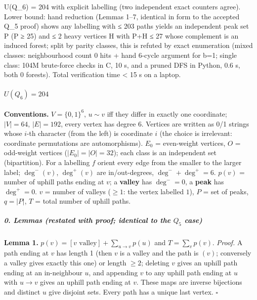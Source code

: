 
U(Q\_6) = 204 with explicit labelling (two independent exact counters
agree). Lower bound: hand reduction (Lemmas 1--7, identical in form to
the accepted Q\_5 proof) shows any labelling with ≤ 203 paths yields an
independent peak set P (\textbar P\textbar{} ≥ 25) and ≤ 2 heavy
vertices H with \textbar P\textbar+\textbar H\textbar{} ≤ 27 whose
complement is an induced forest; split by parity classes, this is
refuted by exact enumeration (mixed classes: neighbourhood count 0 hits
+ hand 6-cycle argument for b=1; single class: 104M brute-force checks
in C, 10 s, and a pruned DFS in Python, 0.6 s, both 0 forests). Total
verification time \textless{} 15 s on a laptop.


\paragraph{\texorpdfstring{\(U(Q_6)=204\)}{U(Q\_6)=204}}\label{uq_6204}

\textbf{Conventions.} \(V=\{0,1\}^6\), \(u\sim v\) iff they differ in
exactly one coordinate; \(|V|=64\), \(|E|=192\), every vertex has degree
\(6\). Vertices are written as 0/1 strings whose \(i\)-th character
(from the left) is coordinate \(i\) (the choice is irrelevant:
coordinate permutations are automorphisms). \(E_0\) = even-weight
vertices, \(O\) = odd-weight vertices (\(|E_0|=|O|=32\)); each class is
an independent set (bipartition). For a labelling \(f\) orient every
edge from the smaller to the larger label; \(\deg^-(v)\), \(\deg^+(v)\)
are in/out-degrees, \(\deg^-+\deg^+=6\). \(p(v)\) = number of uphill
paths ending at \(v\); a \textbf{valley} has \(\deg^-=0\), a
\textbf{peak} has \(\deg^+=0\). \(v\) = number of valleys (\(\ge1\): the
vertex labelled \(1\)), \(P\) = set of peaks, \(q=|P|\), \(T\) = total
number of uphill paths.

\subparagraph{\texorpdfstring{0. Lemmas (restated with proof; identical
to the \(Q_5\)
case)}{0. Lemmas (restated with proof; identical to the Q\_5 case)}}\label{lemmas-restated-with-proof-identical-to-the-q_5-case}

\textbf{Lemma 1.} \(p(v)=[v\text{ valley}]+\sum_{u\to v}p(u)\) and
\(T=\sum_v p(v)\). \emph{Proof.} A path ending at \(v\) has length 1
(then \(v\) is a valley and the path is \((v)\); conversely a valley
gives exactly this one) or length \(\ge2\); deleting \(v\) gives an
uphill path ending at an in-neighbour \(u\), and appending \(v\) to any
uphill path ending at \(u\) with \(u\to v\) gives an uphill path ending
at \(v\). These maps are inverse bijections and distinct \(u\) give
disjoint sets. Every path has a unique last vertex. \(\square\)


